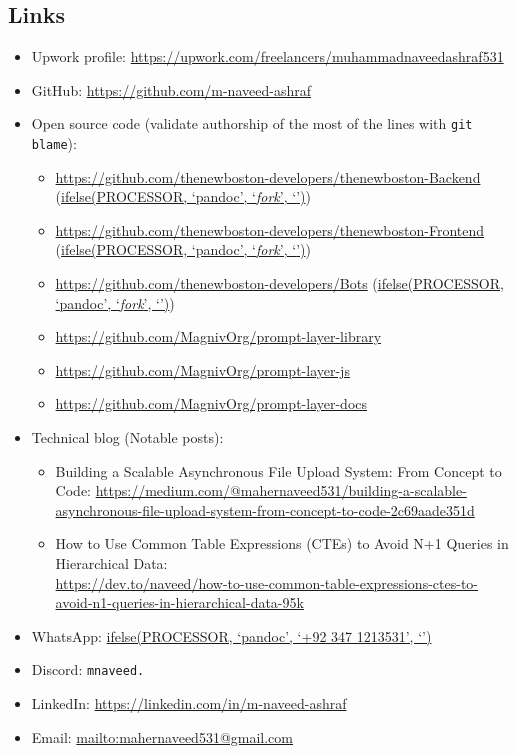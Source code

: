 \documentclass[a4paper,11pt]{article}
\newcommand{\chref}[2]{\href{#1}
{ifelse(PROCESSOR, `pandoc', `#2', `\underline{\smash{#2}}')}}
\newcommand{\itchref}[2]{\chref{#1}{\textit{#2}}}  %
\newcommand{\nesteditemize}[1]{%
    \vspace{2pt}%
    \begin{itemize}%
        \setlength{\itemsep}{2pt}%
        #1%
      \end{itemize}%
    }
\begin{document}
\subsection*{Links}
\begin{itemize}
    \setlength{\itemsep}{4pt}
    \item Upwork profile: \url{https://upwork.com/freelancers/muhammadnaveedashraf531}
    \item GitHub: \url{https://github.com/m-naveed-ashraf}

    \item Open source code (validate authorship of the most of the lines with \texttt{git blame}):
        \nesteditemize{
            \item \url{https://github.com/thenewboston-developers/thenewboston-Backend} (\itchref{https://github.com/m-naveed-ashraf/thenewboston-Backend}{fork})
            \item \url{https://github.com/thenewboston-developers/thenewboston-Frontend} (\itchref{https://github.com/m-naveed-ashraf/thenewboston-Frontend}{fork})
            \item \url{https://github.com/thenewboston-developers/Bots} (\itchref{https://github.com/m-naveed-ashraf/thenewboston-bots}{fork})
            \item \url{https://github.com/MagnivOrg/prompt-layer-library}
            \item \url{https://github.com/MagnivOrg/prompt-layer-js}
            \item \url{https://github.com/MagnivOrg/prompt-layer-docs}

        }
    \item Technical blog (Notable posts):
        \nesteditemize{
            \item Building a Scalable Asynchronous File Upload System: From Concept to Code: \url{https://medium.com/@mahernaveed531/building-a-scalable-asynchronous-file-upload-system-from-concept-to-code-2c69aade351d}
            \item How to Use Common Table Expressions (CTEs) to Avoid N+1 Queries in Hierarchical Data:\\
            \url{https://dev.to/naveed/how-to-use-common-table-expressions-ctes-to-avoid-n1-queries-in-hierarchical-data-95k}
        }
    \item WhatsApp: \chref{https://wa.me/923471213531}{+92 347 1213531}
    \item Discord: \texttt{mnaveed.}
    \item LinkedIn: \url{https://linkedin.com/in/m-naveed-ashraf}
    \item Email: \url{mailto:mahernaveed531@gmail.com}
\end{itemize}
\end{document}
